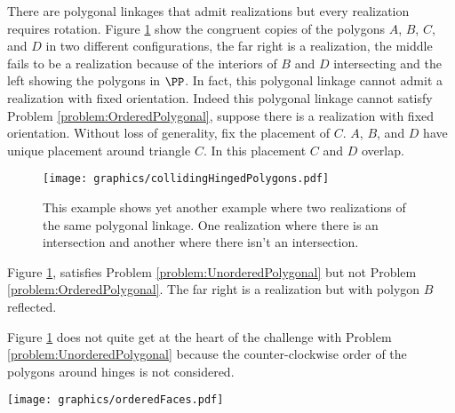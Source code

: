 There are polygonal linkages that admit realizations but every realization requires rotation.
Figure \ref{fig:collidingHingedPolygons} show the congruent copies of the polygons $A$, $B$, $C$, and $D$ in two different configurations, the far right is a realization, the middle fails to be a realization because of the interiors of $B$ and $D$ intersecting and the left showing the polygons in $\PP$.  
In fact, this polygonal linkage cannot admit a realization with fixed orientation.
Indeed this polygonal linkage cannot satisfy Problem \ref{problem:OrderedPolygonal}, suppose there is a realization with fixed orientation.  
Without loss of generality, fix the placement of $C$.
$A$, $B$, and $D$ have unique placement around triangle $C$.  
In this placement $C$ and $D$ overlap.%
\begin{figure}[!htbp]\begin{center}
\texttt{[image: graphics/collidingHingedPolygons.pdf]}
\end{center} 
\caption{This example shows yet another example where two realizations of the same polygonal linkage. 
 One realization where there is an intersection and another where there isn't an intersection.}\label{fig:collidingHingedPolygons}
\end{figure}
Figure \ref{fig:collidingHingedPolygons}, satisfies Problem \ref{problem:UnorderedPolygonal} but not Problem \ref{problem:OrderedPolygonal}.
 The far right is a realization but with polygon $B$ reflected.

Figure \ref{fig:collidingHingedPolygons} does not quite get at the heart of the challenge with Problem \ref{problem:UnorderedPolygonal} because the counter-clockwise order of the polygons around hinges is not considered.

\begin{minipage}{\linewidth}
\begin{center}
\texttt{[image: graphics/orderedFaces.pdf]}
\end{center}
\label{fig:orderedFaces.pdf}
\end{minipage}

